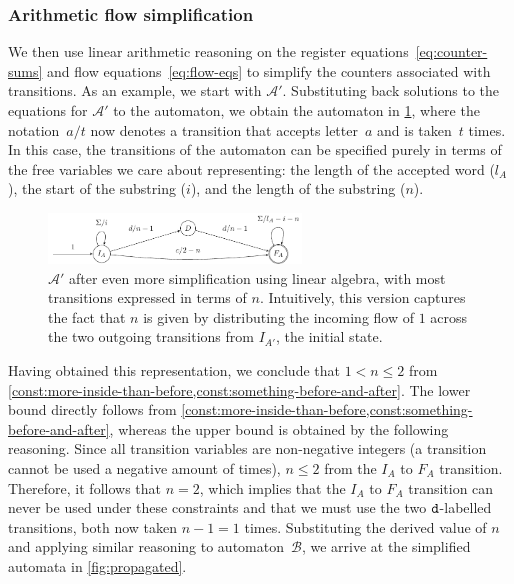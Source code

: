 \subsubsection{Arithmetic flow simplification}\label{sec:intuition:algebra}

We then use linear arithmetic reasoning on the register
equations~\eqref{eq:counter-sums} and flow
equations~\eqref{eq:flow-eqs} to simplify the counters associated
with transitions.
As an example, we start with $\mathcal{A}'$. Substituting back
solutions to the equations for $\mathcal{A}'$ to the automaton, we obtain the
automaton in \cref{fig:a_2}, where the notation~$a / t$ now denotes
a transition that accepts letter~$a$ and is taken~$t$ times.
In this case, the transitions of the automaton
can be specified purely in terms of the free
variables we care about representing:  the length of the accepted word ($l_A$), the
start of the substring ($i$), and the length of the substring ($n$).

\begin{figure}[tb]
  \centering 
  \includegraphics[width=0.6\textwidth]{a_2}
  \caption{ $\mathcal{A}'$ after even more simplification using linear algebra,
   with most transitions expressed
  in terms of $n$. Intuitively, this version captures the fact that $n$ is given
  by distributing the incoming flow of $1$ across the two outgoing transitions
  from $I_{A'}$, the initial state.}
  \label{fig:a_2}
\end{figure}

Having obtained this representation, we conclude that $1 < n \leq 2$
from
\cref{const:more-inside-than-before,const:something-before-and-after}. The
lower bound directly follows from
\cref{const:more-inside-than-before,const:something-before-and-after},
whereas the upper bound is obtained by the following reasoning. Since all
transition variables are non-negative integers (a transition cannot be
used a negative amount of times), $n \leq 2$ from the $I_A$ to $F_A$
transition. Therefore, it follows that $n=2$, which implies that the
$I_A$ to $F_A$ transition can never be used under these constraints
and that we must use the two $\texttt{d}$-labelled transitions, both now
taken $n-1 =1$ times.
%
Substituting the derived value of $n$ and applying similar
reasoning to automaton~$\mathcal{B}$, we arrive at the simplified
automata in \cref{fig:propagated}.


